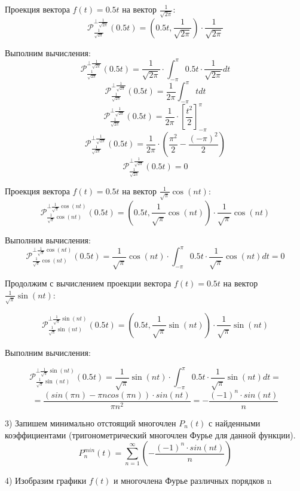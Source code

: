 \documentclass{article}
\begin{document}
Проекция вектора \(f(t) = 0.5t\) на вектор \(\frac{1}{\sqrt{2\pi}}\):
\[\mathcal{P}_{\frac{1}{\sqrt{2\pi}}}^{\bot \frac{1}{\sqrt{2\pi}}}(0.5t) = \left(0.5t, \frac{1}{\sqrt{2\pi}}\right) \cdot \frac{1}{\sqrt{2\pi}}\]


Выполним вычисления:
\[\mathcal{P}_{\frac{1}{\sqrt{2\pi}}}^{\bot \frac{1}{\sqrt{2\pi}}}(0.5t) = \frac{1}{\sqrt{2\pi}} \cdot \int_{-\pi}^{\pi} 0.5t \cdot \frac{1}{\sqrt{2\pi}} dt\]
\[\mathcal{P}_{\frac{1}{\sqrt{2\pi}}}^{\bot \frac{1}{\sqrt{2\pi}}}(0.5t) = \frac{1}{2\pi} \int_{-\pi}^{\pi} t dt\]
\[\mathcal{P}_{\frac{1}{\sqrt{2\pi}}}^{\bot \frac{1}{\sqrt{2\pi}}}(0.5t) = \frac{1}{2\pi} \cdot \left[\frac{t^2}{2}\right]_{-\pi}^{\pi}\]
\[\mathcal{P}_{\frac{1}{\sqrt{2\pi}}}^{\bot \frac{1}{\sqrt{2\pi}}}(0.5t) = \frac{1}{2\pi} \cdot \left(\frac{\pi^2}{2} - \frac{(-\pi)^2}{2}\right)\]
\[\mathcal{P}_{\frac{1}{\sqrt{2\pi}}}^{\bot \frac{1}{\sqrt{2\pi}}}(0.5t) = 0\]

Проекция вектора \(f(t) = 0.5t\) на вектор \(\frac{1}{\sqrt{\pi}}\cos(nt)\):
\[\mathcal{P}_{\frac{1}{\sqrt{\pi}}\cos(nt)}^{\bot \frac{1}{\sqrt{\pi}}\cos(nt)}(0.5t) = \left(0.5t, \frac{1}{\sqrt{\pi}}\cos(nt)\right) \cdot \frac{1}{\sqrt{\pi}}\cos(nt)\]


Выполним вычисления:
\[\mathcal{P}_{\frac{1}{\sqrt{\pi}}\cos(nt)}^{\bot \frac{1}{\sqrt{\pi}}\cos(nt)}(0.5t) = \frac{1}{\sqrt{\pi}}\cos(nt) \cdot \int_{-\pi}^{\pi} 0.5t \cdot \frac{1}{\sqrt{\pi}}\cos(nt) dt = 0\]


Продолжим с вычислением проекции вектора \(f(t) = 0.5t\) на вектор \(\frac{1}{\sqrt{\pi}}\sin(nt)\):

\[\mathcal{P}_{\frac{1}{\sqrt{\pi}}\sin(nt)}^{\bot \frac{1}{\sqrt{\pi}}\sin(nt)}(0.5t) = \left(0.5t, \frac{1}{\sqrt{\pi}}\sin(nt)\right) \cdot \frac{1}{\sqrt{\pi}}\sin(nt)\]

Выполним вычисления:

\[\mathcal{P}_{\frac{1}{\sqrt{\pi}}\sin(nt)}^{\bot \frac{1}{\sqrt{\pi}}\sin(nt)}(0.5t) = \frac{1}{\sqrt{\pi}}\sin(nt) \cdot \int_{-\pi}^{\pi} 0.5t \cdot \frac{1}{\sqrt{\pi}}\sin(nt) dt = \]
\[= \frac{(sin(\pi n)-\pi n cos(\pi n ))\cdot sin(nt)}{\pi n^2}= - \frac{(-1)^n\cdot sin(nt)}{n}\]


3) Запишем минимально отстоящий многочлен $P_n(t)$ с найденными коэффициентами
(тригонометрический многочлен Фурье для данной функции).\\
\[P_n^{min}(t)= \sum_{n=1}^{\infty}\left(- \frac{(-1)^n\cdot sin(nt)}{n}\right)\]


4) Изобразим графики $f(t)$ и многочлена Фурье различных
порядков n\\
\end{document}
